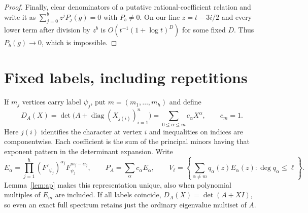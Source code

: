 \documentclass[11pt]{article}
\theoremstyle{remark}\newtheorem{remark}[theorem]{Remark}
\DeclareMathOperator{\diag}{diag}
\begin{document}
\begin{proof}
Finally, clear denominators of a putative rational-coefficient relation and write it as $\sum_{j=0}^b z^j P_j(g)=0$ with $P_b\ne0$. On our line $z=t-3i/2$ and every lower term after division by $z^b$ is $O(t^{-1}(1+\log t)^D)$ for some fixed $D$. Thus $P_b(g)\to0$, which is impossible.
\end{proof}

\section{Fixed labels, including repetitions}
If $m_j$ vertices carry label $\psi_j$, put $m=(m_1,\ldots,m_h)$ and define
\begin{equation}\label{eq:group}
 D_A(X)=\det\bigl(A+\diag(X_{j(i)})_{i=1}^{n}\bigr)
 =\sum_{0\le\alpha\le m} c_\alpha X^\alpha,\qquad c_m=1 .
\end{equation}
Here $j(i)$ identifies the character at vertex $i$ and inequalities on indices are componentwise. Each coefficient is the sum of the principal minors having that exponent pattern in the determinant expansion. Write
\[
 E_\alpha=\prod_{j=1}^h(F'_{\psi_j})^{\alpha_j}F_{\psi_j}^{m_j-\alpha_j},
 \qquad P_A=\sum_\alpha c_\alpha E_\alpha,\qquad
 V_\ell=\left\{\sum_{\alpha\ne m} q_\alpha(z)E_\alpha(z):\deg q_\alpha\le\ell\right\}.
\]
Lemma~\ref{lem:ap} makes this representation unique, also when polynomial multiples of $E_m$ are included. If all labels coincide, $D_A(X)=\det(A+XI)$, so even an exact full spectrum retains just the ordinary eigenvalue multiset of $A$.
\end{document}
